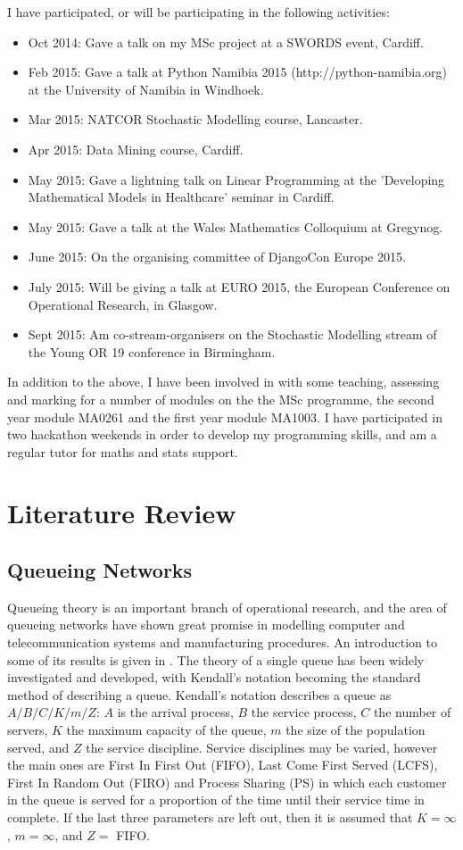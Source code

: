 \documentclass{article}
\begin{document}
I have participated, or will be participating in the following activities:
\begin{itemize}
    \item Oct 2014: Gave a talk on my MSc project at a SWORDS event, Cardiff.
    \item Feb 2015: Gave a talk at Python Namibia 2015 (http://python-namibia.org) at the University of Namibia in Windhoek.
    \item Mar 2015: NATCOR Stochastic Modelling course, Lancaster.
    \item Apr 2015: Data Mining course, Cardiff.
    \item May 2015: Gave a lightning talk on Linear Programming at the 'Developing Mathematical Models in Healthcare' seminar in Cardiff.
    \item May 2015: Gave a talk at the Wales Mathematics Colloquium at Gregynog.
    \item June 2015: On the organising committee of DjangoCon Europe 2015.
    \item July 2015: Will be giving a talk at EURO 2015, the European Conference on Operational Research, in Glasgow.
    \item Sept 2015: Am co-stream-organisers on the Stochastic Modelling stream of the Young OR 19 conference in Birmingham.
\end{itemize}

In addition to the above, I have been involved in with some teaching, assessing and marking for a number of modules on the the MSc programme, the second year module MA0261 and the first year module MA1003.
I have participated in two hackathon weekends in order to develop my programming skills, and am a regular tutor for maths and stats support.


\section{Literature Review}

\subsection{Queueing Networks}
Queueing theory is an important branch of operational research, and the area of queueing networks have shown great promise in modelling computer and telecommunication systems and manufacturing procedures.
An introduction to some of its results is given in \cite{stewart09}.
The theory of a single queue has been widely investigated and developed, with Kendall's notation becoming the standard method of describing a queue.
Kendall's notation describes a queue as $A/B/C/K/m/Z$: $A$ is the arrival process, $B$ the service process, $C$ the number of servers, $K$ the maximum capacity of the queue, $m$ the size of the population served, and $Z$ the service discipline.
Service disciplines may be varied, however the main ones are First In First Out (FIFO), Last Come First Served (LCFS), First In Random Out (FIRO) and Process Sharing (PS) in which each customer in the queue is served for a proportion of the time until their service time in complete.
If the last three parameters are left out, then it is assumed that $K = \infty$, $m = \infty$, and $Z =$ FIFO.
\end{document}
